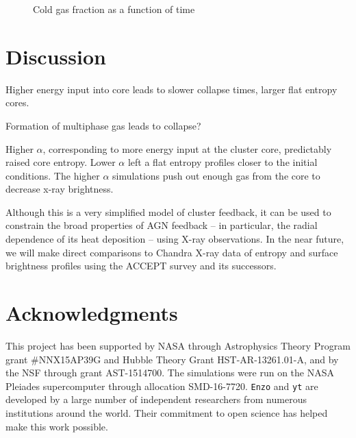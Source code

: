 \documentclass[iop,apjl, twocolappendix]{emulateapj}   %
\begin{document}
\begin{figure}
  \caption{Cold gas fraction as a function of time}
\end{figure}



\section{Discussion}
\label{sec:discussion}

\textbullet Higher energy input into core leads to slower collapse times, larger flat entropy cores.

\textbullet Formation of multiphase gas leads to collapse?

Higher $\alpha$, corresponding to more energy input at the cluster core,
predictably raised core entropy. Lower $\alpha$ left a flat entropy
profiles closer to the initial conditions.  The higher $\alpha$
simulations push out enough gas from the core to decrease x-ray
brightness. 

Although this is a very simplified model of cluster feedback, it can be used to
constrain the broad properties of AGN feedback -- in particular, the radial
dependence of its heat deposition -- using X-ray observations.  In the near
future, we will make direct comparisons to Chandra X-ray data of entropy and
surface brightness profiles  using the ACCEPT survey
\cite{cavagnolo_intracluster_2009} and its successors.

\acknowledgments
\section{Acknowledgments}
\label{sec:acknowledgments}
This project has been supported by NASA through Astrophysics Theory Program
grant \#NNX15AP39G and Hubble Theory Grant HST-AR-13261.01-A, and by the
NSF through grant AST-1514700.  The simulations were run on the NASA
Pleiades supercomputer through allocation SMD-16-7720.  \texttt{Enzo} and
\texttt{yt} are developed by a large number of independent researchers from
numerous institutions around the world. Their commitment to open science
has helped make this work possible.

%



\end{document}
